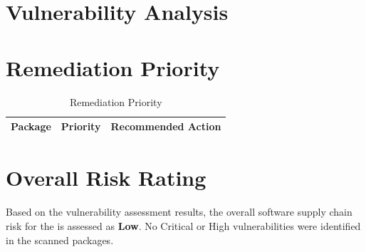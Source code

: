 \vspace{0.4cm}


\section{Vulnerability Analysis}




\section{Remediation Priority}

\begin{table}[H]
\centering
\small
\renewcommand{\arraystretch}{1.3}

\begin{tabular}{p{5cm}p{3cm}p{5cm}}
\toprule
\rowcolor{ZWPrimary}
\textbf{\color{white}Package} & \textbf{\color{white}Priority} & \textbf{\color{white}Recommended Action} \\
\midrule
\bottomrule
\end{tabular}
\caption{Remediation Priority}
\end{table}

\vspace{0.4cm}


\section{Overall Risk Rating}

Based on the vulnerability assessment results, the overall software supply chain risk for the \textbf{\ProjectName} is assessed as \textbf{Low}. No Critical or High vulnerabilities were identified in the scanned packages.

\vspace{0.4cm}

